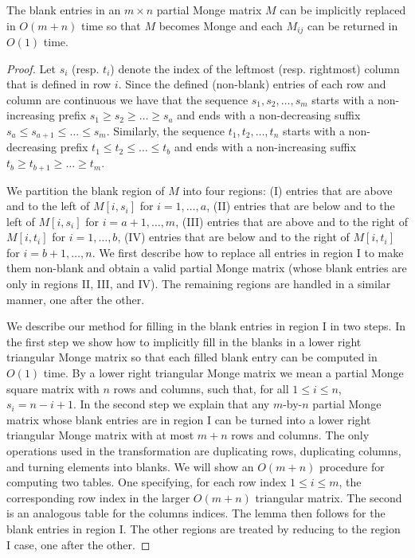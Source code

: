 \documentclass{llncs}
\begin{document}
 
\begin{lemma}\label{lemma:filltheblanks}
The blank entries in an $m\times n$ partial Monge matrix $M$ can be implicitly replaced in $O(m+n)$ time so that $M$ becomes Monge and each $M_{ij}$ can be returned in $O(1)$ time.
\end{lemma}
\begin{proof}
Let $s_i$ (resp. $t_i$) denote the index of the leftmost (resp. rightmost) column that is defined in row $i$. 
Since the defined (non-blank) entries of each row and column are continuous we have that the sequence $ s_1,s_2,\ldots,s_m$ starts with a non-increasing prefix $s_1\ge s_2\ge \ldots \ge s_a$ and ends with a non-decreasing suffix $s_a\le s_{a+1}\le \ldots \le s_m$. 
Similarly, the sequence $t_1,t_2,\ldots,t_n$ starts with a non-decreasing prefix $ t_1\le t_2\le \ldots \le t_b$ and ends with a non-increasing suffix $t_b\ge t_{b+1}\ge \ldots \ge t_m$. 

We partition the blank region of $M$ into four regions: (I) entries that are above and to the left of $M[i, s_i]$ for $i=1,\ldots,a$, 
(II) entries that are below and to the left of $M[i, s_i]$ for $i=a+1,\ldots,m$, 
(III) entries that are above and to the right of $M[i ,t_i]$ for $i=1,\ldots,b$, 
(IV) entries that are below and to the right of $M[i ,t_i]$ for $i=b+1,\ldots,n$.
We first describe how to replace all entries in region I to make them non-blank and
obtain a valid partial Monge matrix (whose blank entries are only in regions II, III, and IV). The remaining regions are handled in a similar manner, one after the other.

We describe our method for filling in the blank entries in region I in two steps. In the first step we show how to implicitly fill in the blanks in a lower right triangular Monge matrix so that each filled blank entry can be computed in $O(1)$ time. By a lower right triangular Monge matrix we mean a partial Monge square matrix with $n$ rows and columns, such that, for all $1\leq i\leq n$, $s_i = n-i+1$. In the second step we explain that any $m$-by-$n$ partial Monge matrix whose blank entries are in region I can be turned into a lower right triangular Monge matrix with at most $m+n$ rows and columns. The only operations used in the transformation are duplicating rows, duplicating columns, and turning elements into blanks. We will show an $O(m+n)$ procedure for computing two tables. One specifying, for each row index $1\leq i\leq m$, the corresponding row index in the larger $O(m+n)$ triangular matrix. The second is an analogous table for the columns indices. The lemma then follows for the blank entries in region I. The other regions are treated by reducing to the region I case, one after the other.


\end{proof}
\end{document}
